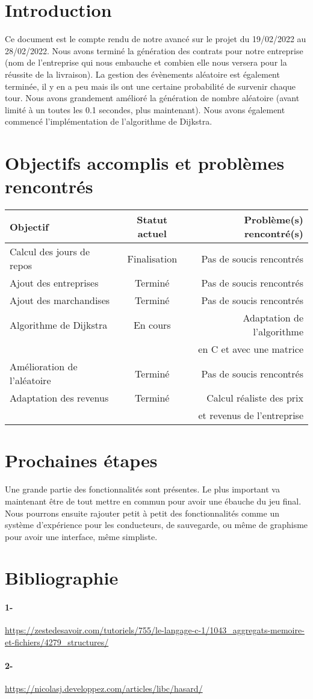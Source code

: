 \documentclass[a4paper, 12pt]{article}
\begin{document}
\newpage



\section*{Introduction}
      Ce document est le compte rendu de notre avancé sur le projet du 19/02/2022 au 28/02/2022. Nous avons terminé la génération des contrats pour notre entreprise (nom de l'entreprise qui nous embauche et combien elle nous versera pour la réussite de la livraison). La gestion des évènements aléatoire est également terminée, il y en a peu mais ils ont une certaine probabilité de survenir chaque tour. Nous avons grandement amélioré la génération de nombre aléatoire (avant limité à un toutes les 0.1 secondes, plus maintenant). Nous avons également commencé l'implémentation de l'algorithme de Dijkstra. 

\section{Objectifs accomplis et problèmes rencontrés}
     \begin{tabular}{|l|c|r|}
  \hline
  Objectif & Statut actuel & Problème(s) rencontré(s) \\
  \hline
  Calcul des jours de repos & Finalisation & Pas de soucis rencontrés\\
  Ajout des entreprises & Terminé & Pas de soucis rencontrés\\
  Ajout des marchandises & Terminé & Pas de soucis rencontrés\\
  Algorithme de Dijkstra & En cours & Adaptation de l'algorithme\\&& en C et avec une matrice\\
  Amélioration de l'aléatoire & Terminé & Pas de soucis rencontrés\\
  Adaptation des revenus & Terminé & Calcul réaliste des prix\\&& et revenus de l'entreprise\\
  

  \hline
\end{tabular}
\section{Prochaines étapes}
    Une grande partie des fonctionnalités sont présentes. Le plus important va maintenant être de tout mettre en commun pour avoir une ébauche du jeu final. Nous pourrons ensuite rajouter petit à petit des fonctionnalités comme un système d'expérience pour les conducteurs, de sauvegarde, ou même de graphisme pour avoir une interface, même simpliste.
    

   \appendix  %
   \section{Bibliographie}
   \paragraph{1- }
    \url{https://zestedesavoir.com/tutoriels/755/le-langage-c-1/1043_aggregats-memoire-et-fichiers/4279_structures/}
    \paragraph{2- }
    \url{https://nicolasj.developpez.com/articles/libc/hasard/}
\end{document}
